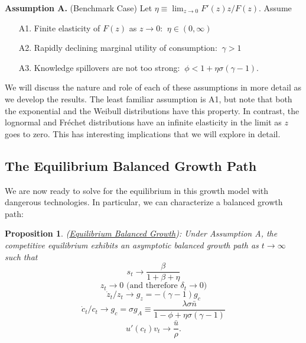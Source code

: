 \documentclass[12pt,twoside]{article}
\newcommand{\proptitle}[1]{\color{ChadBlue} \textnormal{(#1):}}
\newtheorem{proposition}{\color{ChadGreen} Proposition}
\newcommand{\assume}[2]{{\bf{Assumption #1}} (#2)}
\newcommand{\clr}[1]{{\color{ChadBlue} #1}}
\begin{document}
\vspace{.1in} 
\hypertarget{ASSUME}{} \clr{
\assume{A.}{Benchmark Case} 
Let $\eta \equiv \lim_{z \rightarrow 0} F'(z) z/F(z)$.  Assume
\begin{enumerate} 
\addtolength{\itemsep}{-\baselineskip}
\setlength{\itemindent}{2em}
\item[A1.] Finite elasticity of $F(z)$ as $z \rightarrow 0$: $\ \eta \in (0,\infty)$  \\
\item[A2.] Rapidly declining marginal utility of consumption: $\ \gamma>1$ \\
\item[A3.] Knowledge spillovers are not too strong: $\ \phi<1+\eta \sigma (\gamma-1)$.
\end{enumerate}
} \vspace{.1in}
{\noindent 
We will discuss the nature and role of each of these assumptions in more
detail as we develop the results. The least familiar assumption is A1,
but note that both the exponential and the Weibull distributions have
this property. In contrast, the lognormal and Fr\'{e}chet distributions
have an infinite elasticity in the limit as $z$ goes to zero. This has
interesting implications that we will explore in detail.}

\subsection{The Equilibrium Balanced Growth Path}

We are now ready to solve for the equilibrium in this growth model with
dangerous technologies.  In particular, we can characterize a balanced
growth path:

\begin{proposition}
\proptitle{\hyperlink{proof:CE}{Equilibrium Balanced Growth}}
\label{prop:CE} \hypertarget{prop:CE}{}
Under Assumption A,
the competitive equilibrium exhibits an asymptotic balanced growth path
as $t \rightarrow \infty$ such that
\begin{equation}
s_t \rightarrow \frac{\beta}{1+\beta+\eta} 
\end{equation}
\begin{equation}
z_t \rightarrow 0 \mbox{ (and therefore } \delta_t \rightarrow 0
\mbox{)} 
\end{equation}
\begin{equation}
\label{eq:gz} \dot{z}_t/z_t \rightarrow g_z = - (\gamma-1) g_c 
\end{equation}
\begin{equation}
\dot{c}_t/c_t \rightarrow g_c=\sigma g_A \equiv \frac{\lambda \sigma
  \bar{n}}{1-\phi+\eta \sigma (\gamma-1)}
\end{equation}
\begin{equation}
\label{eq:v}
u'(c_t) v_t \rightarrow \frac{\bar{u}}{\rho}. 
\end{equation}
\end{proposition}
\end{document}
